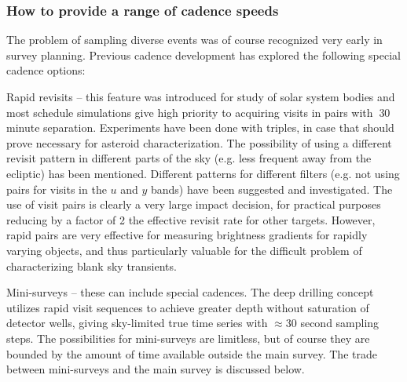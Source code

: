 \subsubsection{How to provide a range of cadence speeds}

The problem of sampling diverse events was of course recognized very
early in survey planning. Previous cadence development has explored the
following special cadence options:

\begin{description}

\item{Rapid revisits} -- this feature was introduced for study of solar
system bodies and most schedule simulations give high priority to
acquiring visits in pairs with $~$30 minute separation.  Experiments
have been done with triples, in case that should prove necessary for
asteroid characterization.  The possibility of using a different revisit
pattern in different parts of the sky (e.g. less frequent away from the
ecliptic) has been mentioned.  Different patterns for different filters
(e.g. not using pairs for visits in the $u$ and $y$ bands) have been
suggested and investigated. The use of visit pairs is clearly a very
large impact decision, for practical purposes reducing by a factor of 2
the effective revisit rate for other targets. However, rapid pairs are
very effective for measuring brightness gradients for rapidly varying
objects, and thus particularly valuable for the difficult problem of
characterizing blank sky transients.

\item{Mini-surveys} --  these can include special cadences. The deep
drilling concept utilizes rapid visit sequences to achieve greater depth
without saturation of detector wells, giving sky-limited true time
series with $\approx$30 second sampling steps.  The possibilities for
mini-surveys are limitless, but of course they are bounded by the amount
of time available outside the main survey. The trade between
mini-surveys and the main survey is discussed below.


\end{description}
